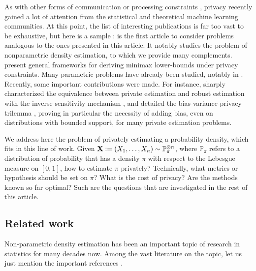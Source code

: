 \documentclass[10pt]{article} %
\newcommand{\Prob}[0]{\mathbb{P}}
\newcommand{\eqdef}{\vcentcolon=}
\newcommand\vect[1]{\mathbf{#1}}
\newcommand\p[1]{\left( {#1}\right)}
\begin{document}
As with other forms of communication or processing constraints \citep{BarnesHO19,BarnesHO20,AcharyaCST21a,AcharyaCMT21,AcharyaCST21b,AcharyaCFST21}, privacy recently gained a lot of attention from the statistical and theoretical machine learning communities. At this point, the list of interesting publications is far too vast to be exhaustive, but here is a sample : \citet{wasserman2010statistical} is the first article to consider problems analogous to the ones presented in this article. It notably studies the problem of nonparametric density estimation, to which we provide many complements. \citet{duchi2013localpreprint,duchi2013local,duchi2018minimax,barber2014privacy,acharya2021differentially,lalanne2022statistical} present general frameworks for deriving minimax lower-bounds under privacy constraints. Many parametric problems have already been studied, notably in \citet{acharya2018differentially,acharya2021differentially,karwa2017finite,kamath2019highdimensional,biswas2020coinpress,lalanne2022private,lalanne2023private,kamath2022improved,singhal2023polynomial}. Recently, some important contributions were made. For instance, \citet{asi2023robustness} sharply characterized the equivalence between private estimation and robust estimation with the inverse sensitivity mechanism \citep{asi2020near,asi2021nips}, and \citet{kamath2023biasvarianceprivacy} detailed the bias-variance-privacy trilemma
, proving in particular the necessity of adding bias, even on distributions with bounded support, for many private estimation problems.

We address here the problem of privately estimating a probability density, which fits in this line of work. Given $\vect{X} \eqdef \p{X_1, \dots, X_n} \sim \Prob_\pi^{\otimes n}$, where $\Prob_\pi$ refers to a distribution of probability that 
has a density $\pi$ 
with respect to the Lebesgue measure on $[0, 1]$, how to estimate $\pi$ privately? Technically, what metrics or hypothesis should be set on $\pi$? What is the cost of privacy? Are the methods known so far optimal? Such are the questions that are investigated in the rest of this article.

\subsection{Related work}

Non-parametric density estimation has been an important topic of research in statistics for many decades now. Among the vast literature on the topic, let us just mention the important references \citet{gyorfi2002distribution,tsybakov2003introduction}. 
\end{document}
